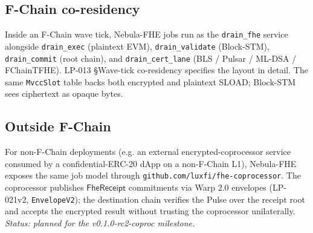 \subsection{F-Chain co-residency}

Inside an F-Chain wave tick, Nebula-FHE jobs run as the
\texttt{drain\_fhe} service alongside \texttt{drain\_exec} (plaintext
EVM), \texttt{drain\_validate} (Block-STM), \texttt{drain\_commit}
(root chain), and \texttt{drain\_cert\_lane} (BLS / Pulsar / ML-DSA
/ FChainTFHE). LP-013 \S Wave-tick co-residency specifies the layout
in detail. The same \texttt{MvccSlot} table backs both encrypted and
plaintext SLOAD; Block-STM sees ciphertext as opaque bytes.

\subsection{Outside F-Chain}

For non-F-Chain deployments (e.g. an external encrypted-coprocessor
service consumed by a confidential-ERC-20 dApp on a non-F-Chain L1),
Nebula-FHE exposes the same job model through
\texttt{github.com/luxfi/fhe-coprocessor}. The coprocessor publishes
$\mathsf{FheReceipt}$ commitments via Warp 2.0 envelopes (LP-021v2,
\texttt{EnvelopeV2}); the destination chain verifies the Pulse
over the receipt root and accepts the encrypted result without
trusting the coprocessor unilaterally. \emph{Status: planned for the
v0.1.0-rc2-coproc milestone.}
